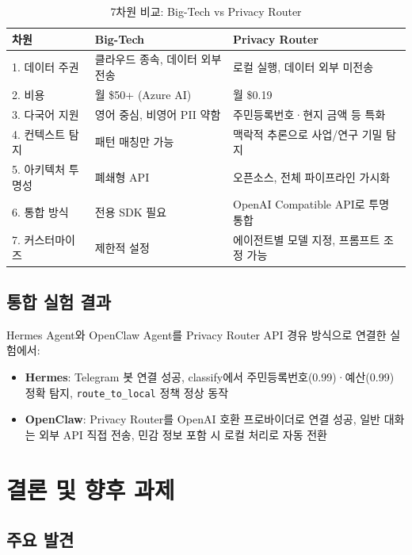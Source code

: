 \documentclass[11pt,a4paper]{article}
\begin{document}
\begin{table}[h]
\centering
\begin{tabular}{@{}p{2.5cm}p{4cm}p{4cm}@{}}
\toprule
차원 & Big-Tech & Privacy Router \\
\midrule
1. 데이터 주권 & 클라우드 종속, 데이터 외부 전송 & 로컬 실행, 데이터 외부 미전송 \\
2. 비용 & 월 \$50+ (Azure AI) & 월 \$0.19 \\
3. 다국어 지원 & 영어 중심, 비영어 PII 약함 & 주민등록번호·현지 금액 등 특화 \\
4. 컨텍스트 탐지 & 패턴 매칭만 가능 & 맥락적 추론으로 사업/연구 기밀 탐지 \\
5. 아키텍처 투명성 & 폐쇄형 API & 오픈소스, 전체 파이프라인 가시화 \\
6. 통합 방식 & 전용 SDK 필요 & OpenAI Compatible API로 투명 통합 \\
7. 커스터마이즈 & 제한적 설정 & 에이전트별 모델 지정, 프롬프트 조정 가능 \\
\bottomrule
\end{tabular}
\caption{7차원 비교: Big-Tech vs Privacy Router}
\end{table}

\subsection{통합 실험 결과}

Hermes Agent와 OpenClaw Agent를 Privacy Router API 경유 방식으로 연결한 실험에서:

\begin{itemize}[nosep]
  \item \textbf{Hermes}: Telegram 봇 연결 성공, classify에서 주민등록번호(0.99)·예산(0.99) 정확 탐지, \texttt{route\_to_local} 정책 정상 동작
  \item \textbf{OpenClaw}: Privacy Router를 OpenAI 호환 프로바이더로 연결 성공, 일반 대화는 외부 API 직접 전송, 민감 정보 포함 시 로컬 처리로 자동 전환
\end{itemize}

\section{결론 및 향후 과제}

\subsection{주요 발견}
\end{document}
